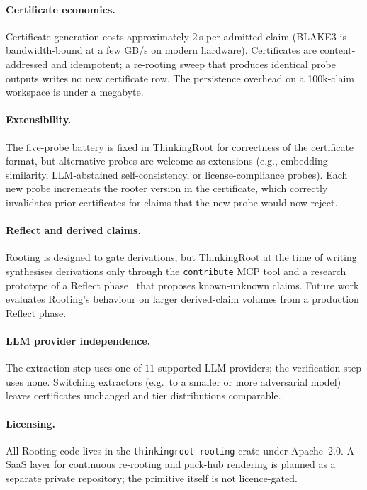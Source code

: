 \documentclass[10pt,a4paper]{article}
\begin{document}
\paragraph{Certificate economics.}
Certificate generation costs approximately $2$\,\textmu s per admitted
claim (BLAKE3 is bandwidth-bound at a few GB/s on modern hardware).
Certificates are content-addressed and idempotent; a re-rooting sweep that
produces identical probe outputs writes no new certificate row. The
persistence overhead on a 100k-claim workspace is under a megabyte.

\paragraph{Extensibility.}
The five-probe battery is fixed in ThinkingRoot for correctness of the
certificate format, but alternative probes are welcome as extensions
(e.g., embedding-similarity, LLM-abstained self-consistency, or
license-compliance probes). Each new probe increments the rooter version
in the certificate, which correctly invalidates prior certificates for
claims that the new probe would now reject.

\paragraph{Reflect and derived claims.}
Rooting is designed to gate derivations, but ThinkingRoot at the time of
writing synthesises derivations only through the \texttt{contribute} MCP
tool and a research prototype of a Reflect phase~\cite{pink2025episodic}
that proposes known-unknown claims. Future work evaluates Rooting's
behaviour on larger derived-claim volumes from a production Reflect phase.

\paragraph{LLM provider independence.}
The extraction step uses one of $11$ supported LLM providers; the
verification step uses none. Switching extractors (e.g.\ to a smaller or
more adversarial model) leaves certificates unchanged and tier
distributions comparable.

\paragraph{Licensing.}
All Rooting code lives in the \texttt{thinkingroot-rooting} crate under
Apache~2.0. A SaaS layer for continuous re-rooting and pack-hub rendering
is planned as a separate private repository; the primitive itself is not
licence-gated.
\end{document}
